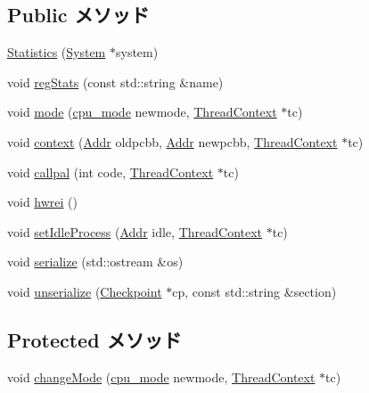 \subsection*{Public メソッド}
\begin{DoxyCompactItemize}
\item 
\hyperlink{classAlphaISA_1_1Kernel_1_1Statistics_a83aac6d65afe578fbf92b926ce7c1c3c}{Statistics} (\hyperlink{classSystem}{System} $\ast$system)
\item 
void \hyperlink{classAlphaISA_1_1Kernel_1_1Statistics_a3dd3443357312bcb75580eaa508c48a4}{regStats} (const std::string \&name)
\item 
void \hyperlink{classAlphaISA_1_1Kernel_1_1Statistics_a69a28205bda54bb9952d3bfd3aa2b432}{mode} (\hyperlink{namespaceAlphaISA_1_1Kernel_aa1fc3805dac6f71f457fbbc263105bf6}{cpu\_\-mode} newmode, \hyperlink{classThreadContext}{ThreadContext} $\ast$tc)
\item 
void \hyperlink{classAlphaISA_1_1Kernel_1_1Statistics_a142daab47c3cbc51299f94f8d0262cfb}{context} (\hyperlink{classm5_1_1params_1_1Addr}{Addr} oldpcbb, \hyperlink{classm5_1_1params_1_1Addr}{Addr} newpcbb, \hyperlink{classThreadContext}{ThreadContext} $\ast$tc)
\item 
void \hyperlink{classAlphaISA_1_1Kernel_1_1Statistics_a7827dc7da6357e12e4cd63cd4e2c4ae3}{callpal} (int code, \hyperlink{classThreadContext}{ThreadContext} $\ast$tc)
\item 
void \hyperlink{classAlphaISA_1_1Kernel_1_1Statistics_a533ed6061eb53157e53d902560bd6d0e}{hwrei} ()
\item 
void \hyperlink{classAlphaISA_1_1Kernel_1_1Statistics_aab8479e51738f53b86d4c67c9a57d6f4}{setIdleProcess} (\hyperlink{classm5_1_1params_1_1Addr}{Addr} idle, \hyperlink{classThreadContext}{ThreadContext} $\ast$tc)
\item 
void \hyperlink{classAlphaISA_1_1Kernel_1_1Statistics_a53e036786d17361be4c7320d39c99b84}{serialize} (std::ostream \&os)
\item 
void \hyperlink{classAlphaISA_1_1Kernel_1_1Statistics_af22e5d6d660b97db37003ac61ac4ee49}{unserialize} (\hyperlink{classCheckpoint}{Checkpoint} $\ast$cp, const std::string \&section)
\end{DoxyCompactItemize}
\subsection*{Protected メソッド}
\begin{DoxyCompactItemize}
\item 
void \hyperlink{classAlphaISA_1_1Kernel_1_1Statistics_a3b94b2c16465171d96e98013e647eb1f}{changeMode} (\hyperlink{namespaceAlphaISA_1_1Kernel_aa1fc3805dac6f71f457fbbc263105bf6}{cpu\_\-mode} newmode, \hyperlink{classThreadContext}{ThreadContext} $\ast$tc)
\end{DoxyCompactItemize}
